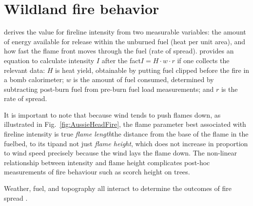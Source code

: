 \chapter{Wildland fire behavior} 



	\citet{rothermel1983} derives the value for fireline intensity from two measurable variables: the amount of energy available for release within the unburned fuel (heat per unit area), and how fast the flame front moves through the fuel (rate of spread).
	\citet{byram1959} provides an equation to calculate intensity $I$ after the fact\textemdash $I = H \cdot w \cdot r$ \textemdash if one collects the relevant data: $H$ is heat yield, obtainable by putting fuel clipped before the fire in a bomb calorimeter; $w$ is the amount of fuel consumed, determined by subtracting post-burn fuel from pre-burn fuel load measurements; and $r$ is the rate of spread.
	
		It is important to note that because wind tends to push flames down, as illustrated in Fig.~\ref{fig:AussieHeadFire}, the flame parameter best associated with fireline intensity is true \emph{flame length}\textemdash the distance from the base of the flame in the fuelbed, to its tip\textemdash and not just \emph{flame height}, which does not increase in proportion to wind speed precisely because the wind lays the flame down. 
		The non-linear relationship between intensity and flame height complicates post-hoc measurements of fire behaviour such as scorch height on trees.
		
Weather, fuel, and topography all interact to determine the outcomes of fire spread \citep{holsinger2016}. 
